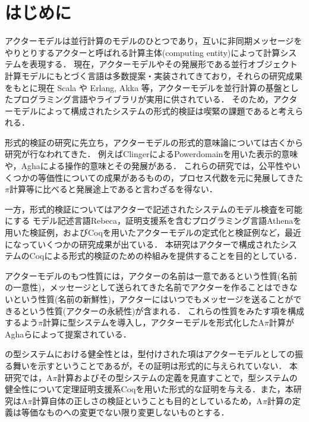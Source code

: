 \section{はじめに}

アクターモデル\cite{Agha:1986aa}は並行計算のモデルのひとつであり，互いに非同期メッセージをやりとりするアクターと呼ばれる計算主体(computing entity)によって計算システムを表現する．
現在，アクターモデルやその発展形である並行オブジェクト計算モデル\cite{Yonezawa:1986aa}にもとづく言語は多数提案・実装されてきており，それらの研究成果をもとに現在 Scala や Erlang, Akka 等，アクターモデルを並行計算の基盤としたプログラミング言語やライブラリが実用に供されている．
そのため，アクターモデルによって構成されたシステムの形式的検証は喫緊の課題であると考えられる．

形式的検証の研究に先立ち，アクターモデルの形式的意味論については古くから研究が行なわれてきた．
例えばClingerによるPowerdomainを用いた表示的意味\cite{Clinger:1981aa}や，Aghaによる操作的意味\cite{Agha:1986aa}とその発展\cite{Agha:1997aa}がある．
これらの研究では，公平性やいくつかの等価性についての成果があるものの，プロセス代数を元に発展してきた$\pi$計算等に比べると発展途上であると言わざるを得ない．

一方，形式的検証についてはアクターで記述されたシステムのモデル検査を可能にする
モデル記述言語Rebeca\cite{Sirjani:2011aa}，証明支援系を含むプログラミング言語Athenaを用いた検証例\cite{Musser:2013aa}，およびCoqを用いたアクターモデルの定式化と検証例\cite{Garnock-Jones:2014aa}など，最近になっていくつかの研究成果が出ている．
本研究はアクターで構成されたシステムのCoqによる形式的検証のための枠組みを提供することを目的としている．

アクターモデルのもつ性質には，アクターの名前は一意であるという性質(名前の一意性)，メッセージとして送られてきた名前でアクターを作ることはできないという性質(名前の新鮮性)，アクターにはいつでもメッセージを送ることができるという性質(アクターの永続性)が含まれる．
これらの性質をみたす項を構成するよう\(\pi\)計算に型システムを導入し，アクターモデルを形式化したA\(\pi\)計算がAghaらによって提案されている\cite{Agha:2004aa}．

\api の型システムにおける健全性とは，型付けされた項はアクターモデルとしての振る舞いを示すということであるが，その証明は形式的に与えられていない．
本研究では，A\(\pi\)計算およびその型システムの定義を見直すことで，型システムの健全性について定理証明支援系Coqを用いた形式的な証明を与える．また，本研究はA\(\pi\)計算自体の正しさの検証ということも目的としているため，A\(\pi\)計算の定義は等価なものへの変更でない限り変更しないものとする．

